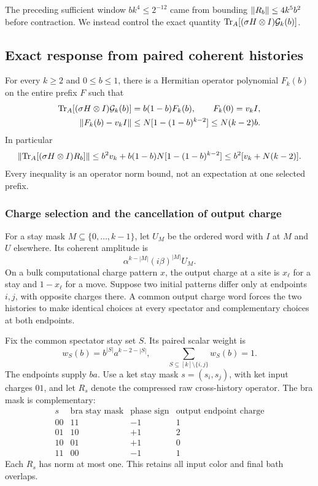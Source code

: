 The preceding sufficient window \(bk^4\le2^{-12}\) came from bounding
\(\lVert R_b\rVert\le4k^5b^2\) before contraction. We instead control the exact
quantity \(\operatorname{Tr}_A[(\sigma H\otimes I)\mathcal G_k(b)]\).

\subsection{Exact response from paired coherent histories}

\begin{theorem}\label{thm:response}
For every \(k\ge2\) and \(0\le b\le1\), there is a Hermitian operator
polynomial \(F_k(b)\) on the entire prefix \(F\) such that
\begin{align}
 \operatorname{Tr}_A[(\sigma H\otimes I)\mathcal G_k(b)]
   &=b(1-b)F_k(b),\qquad F_k(0)=v_kI,\label{eq:Fidentity}\\
 \lVert F_k(b)-v_kI\rVert
   &\le N[1-(1-b)^{k-2}]
    \le N(k-2)b.\label{eq:Fbound}
\end{align}
In particular
\begin{equation}\label{eq:contracted}
 \lVert \operatorname{Tr}_A[(\sigma H\otimes I)R_b]\rVert
 \le b^2v_k+b(1-b)N[1-(1-b)^{k-2}]
 \le b^2[v_k+N(k-2)].
\end{equation}
Every inequality is an operator norm bound, not an expectation at one
selected prefix.
\end{theorem}

\subsubsection{Charge selection and the cancellation of output charge}

For a stay mask \(M\subseteq\{0,\ldots,k-1\}\), let \(U_M\) be the ordered
word with \(I\) at \(M\) and \(U\) elsewhere. Its coherent amplitude is
\[
 \alpha^{k-|M|}(i\beta)^{|M|}U_M.
\]
On a bulk computational charge pattern \(x\), the output charge at a site
is \(x_\ell\) for a stay and \(1-x_\ell\) for a move. Suppose two initial
patterns differ only at endpoints \(i,j\), with opposite charges there.
A common output charge word forces the two histories to make identical
choices at every spectator and complementary choices at both endpoints.

Fix the common spectator stay set \(S\). Its paired scalar weight is
\[
 w_S(b)=b^{|S|}a^{k-2-|S|},\qquad
 \sum_{S\subseteq[k]\setminus\{i,j\}}w_S(b)=1.
\]
The endpoints supply \(ba\). Use a ket stay mask
\(s=(s_i,s_j)\), with ket input charges \(01\), and let \(R_s\) denote
the compressed raw cross-history operator. The bra mask is complementary:
\[
\begin{array}{c|c|c|c}
s&\text{bra stay mask}&\text{phase sign}&
       \text{output endpoint charge}\\ \hline
00&11&-1&1\\
01&10&+1&2\\
10&01&+1&0\\
11&00&-1&1
\end{array}
\]
Each \(R_s\) has norm at most one. This retains all input color and final
bath overlaps.

